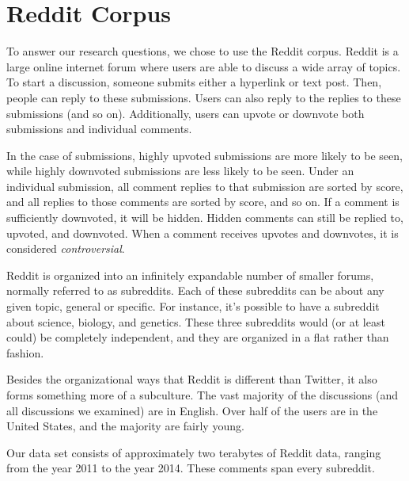 \section{Reddit Corpus}
To answer our research questions, we chose to use the Reddit corpus. Reddit is a large online internet forum where users are able to discuss a wide array of  topics. To start a discussion, someone submits either a hyperlink or text post. Then, people can reply to these submissions. Users can also reply to the replies to these submissions (and so on). Additionally, users can upvote or downvote both submissions and individual comments. 

In the case of submissions, highly upvoted submissions are more likely to be seen, while highly downvoted submissions are less likely to be seen. Under an individual submission, all comment replies to that submission are sorted by score, and all replies to those comments are sorted by score, and so on. If a comment is sufficiently downvoted, it will be hidden. Hidden comments can still be replied to, upvoted, and downvoted. When a comment receives upvotes and downvotes, it is considered \textit{controversial}.  

Reddit is organized into an infinitely expandable number of smaller forums, normally referred to as subreddits. Each of these subreddits can be about any given topic, general or specific. For instance, it's possible to have a subreddit about science, biology, and genetics. These three subreddits would (or at least could) be completely independent, and they are organized in a flat rather than fashion.

Besides the organizational ways that Reddit is different than Twitter, it also forms something more of a subculture. The vast majority of the discussions (and all discussions we examined) are in English. Over half of the users are in the United States, and the majority are fairly young. 

Our data set consists of approximately two terabytes of Reddit data, ranging from the year 2011 to the year 2014. These comments span every subreddit. 

